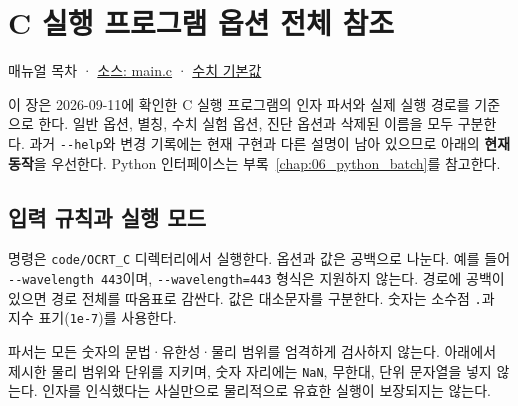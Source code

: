 \chapter{C 실행 프로그램 옵션 전체 참조}
\label{chap:03_options}
매뉴얼 목차 · \href{https://github.com/brtnt/OCRT/blob/54861c68e35ec5aaa3938fad53e93dc2dfa7eb1d/code/OCRT_C/src/main.c}{소스: main.c} · \href{https://github.com/brtnt/OCRT/blob/54861c68e35ec5aaa3938fad53e93dc2dfa7eb1d/code/OCRT_C/src/rt_types.h}{수치 기본값}

이 장은 2026-09-11에 확인한 C 실행 프로그램의 인자 파서와 실제 실행 경로를 기준으로 한다. 일반 옵션, 별칭, 수치 실험 옵션, 진단 옵션과 삭제된 이름을 모두 구분한다. 과거 \texttt{-\allowbreak{}-\allowbreak{}help}와 변경 기록에는 현재 구현과 다른 설명이 남아 있으므로 아래의 \textbf{현재 동작}을 우선한다. Python 인터페이스는 부록~\ref{chap:06_python_batch}를 참고한다.

\section{입력 규칙과 실행 모드}
\label{sec:auto:03_options:1}
명령은 \texttt{code/\allowbreak{}OCRT\_\allowbreak{}C} 디렉터리에서 실행한다. 옵션과 값은 공백으로 나눈다. 예를 들어 \texttt{-\allowbreak{}-\allowbreak{}wavelength 443}이며, \texttt{-\allowbreak{}-\allowbreak{}wavelength=\allowbreak{}443} 형식은 지원하지 않는다. 경로에 공백이 있으면 경로 전체를 따옴표로 감싼다. 값은 대소문자를 구분한다. 숫자는 소수점 \texttt{.\allowbreak{}}과 지수 표기(\texttt{1e-\allowbreak{}7})를 사용한다.

파서는 모든 숫자의 문법·유한성·물리 범위를 엄격하게 검사하지 않는다. 아래에서 제시한 물리 범위와 단위를 지키며, 숫자 자리에는 \texttt{NaN}, 무한대, 단위 문자열을 넣지 않는다. 인자를 인식했다는 사실만으로 물리적으로 유효한 실행이 보장되지는 않는다.


